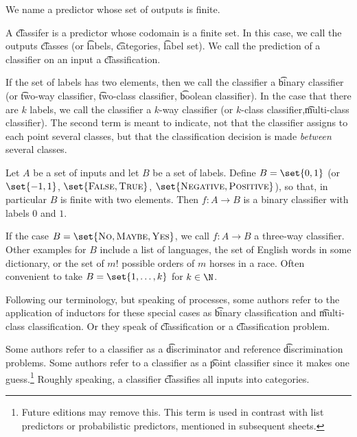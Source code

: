 

We name a predictor whose set of outputs is finite.


A \t{classifer} is a predictor whose codomain is a finite set.
In this case, we call the outputs \t{classes} (or \t{labels},  \t{categories}, \t{label set}).
We call the prediction of a classifier on an input a \t{classification}.

If the set of labels has two elements, then we call the classifier a \t{binary classifier} (or \t{two-way classifier},  \t{two-class classifier}, \t{boolean classifier}).
In the case that there are $k$ labels, we call the classifier a \t{$k$-way classifier} (or \t{$k$-class classifier},\t{multi-class classifier}).
The second term is meant to indicate, not that the classifier assigns to each point several classes, but that the classification decision is made \textit{between} several classes.

Let $A$ be a set of inputs and let $B$ be a set of labels.
Define $B = \set{0, 1}$ (or $
\set{-1,1 }$, $\set{\textsc{False}, \textsc{True}}$, $\set{\textsc{Negative}, \textsc{Positive}}$), so that, in particular $B$ is finite with two elements.
Then $f: A \to B$ is a binary classifier with labels $0$ and $1$.

If the case $B = \set{\text{\textsc{No}}, \textsc{Maybe}, \textsc{Yes}}$, we call $f: A \to B$ a three-way classifier.
Other examples for $B$ include a list of languages, the set of English words in some dictionary, or the set of $m!$ possible orders of $m$ horses in a race.
Often convenient to take $B = \set{1, \dots, k}$ for $k \in \N$.


Following our terminology, but speaking of processes, some authors refer to the application of inductors for these special cases as \t{binary classification} and \t{multi-class classification}.
Or they speak of \t{classification} or a \t{classification problem}.

Some authors refer to a classifier as a \t{discriminator} and reference \t{discrimination problems}.
Some authors refer to a classifier as a \t{point classifier} since it makes one guess.\footnote{Future editions may remove this. This term is used in contrast with list predictors or probabilistic predictors, mentioned in subsequent sheets.}
Roughly speaking, a classifier \t{classifies} all inputs into categories.


